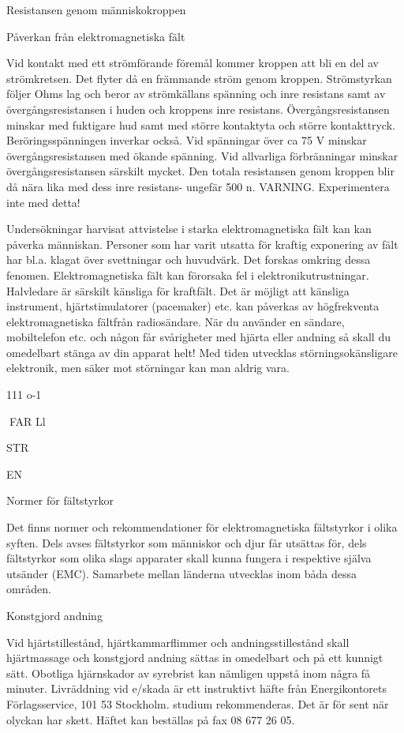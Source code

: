 \documentclass[a4paper,twoside,twocolumn,openright]{book}
\begin{document}
{{{{{Resistansen genom människokroppen

Påverkan från elektromagnetiska fält

Vid kontakt med ett strömförande föremål
kommer kroppen att bli en del av strömkretsen. Det flyter då en främmande ström genom kroppen.
Strömstyrkan följer Ohms lag och beror
av strömkällans spänning och inre resistans
samt av övergångsresistansen i huden och
kroppens inre resistans.
Övergångsresistansen minskar med fuktigare hud samt med större kontaktyta och
större kontakttryck. Beröringsspänningen inverkar också. Vid spänningar över ca 75 V
minskar övergångsresistansen med ökande
spänning. Vid allvarliga förbränningar minskar övergångsresistansen särskilt mycket.
Den totala resistansen genom kroppen blir
då nära lika med dess inre resistans- ungefär 500 n.
VARNING. Experimentera inte med detta!

Undersökningar harvisat attvistelse i starka
elektromagnetiska fält kan kan påverka människan. Personer som har varit utsatta för
kraftig exponering av fält har bl.a. klagat över
svettningar och huvudvärk. Det forskas omkring dessa fenomen.
Elektromagnetiska fält kan förorsaka fel
i elektronikutrustningar. Halvledare är särskilt känsliga för kraftfält. Det är möjligt att
känsliga instrument, hjärtstimulatorer (pacemaker) etc. kan påverkas av högfrekventa
elektromagnetiska fältfrån radiosändare. När
du använder en sändare, mobiltelefon etc.
och någon får svårigheter med hjärta eller
andning så skall du omedelbart stänga av
din apparat helt! Med tiden utvecklas störningsokänsligare elektronik, men säker mot
störningar kan man aldrig vara.

111 o-1

FAR Ll

STR

EN

Normer för fältstyrkor

Det finns normer och rekommendationer för
elektromagnetiska fältstyrkor i olika syften.
Dels avses fältstyrkor som människor
och djur får utsättas för, dels fältstyrkor som
olika slags apparater skall kunna fungera i
respektive själva utsänder (EMC).
Samarbete mellan länderna utvecklas
inom båda dessa områden.

Konstgjord andning

Vid hjärtstillestånd, hjärtkammarflimmer och
andningsstillestånd skall hjärtmassage och
konstgjord andning sättas in omedelbart och
på ett kunnigt sätt. Obotliga hjärnskador av
syrebrist kan nämligen uppstå inom några få
minuter.
Livräddning vid e/skada är ett instruktivt
häfte från Energikontorets Förlagsservice,
101 53 Stockholm. studium rekommenderas.
Det är för sent när olyckan har skett. Häftet
kan beställas på fax 08 677 26 05.

}}}}}
\end{document}
